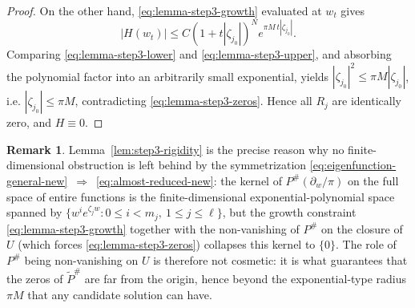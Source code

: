 \documentclass[a4paper,11pt,reqno]{amsart}
\numberwithin{equation}{section}
\theoremstyle{plain} %
\theoremstyle{definition} %
\newtheorem{remark}{Remark}[section]
\theoremstyle{remark}
\begin{document}
\begin{proof}
On the other hand, \eqref{eq:lemma-step3-growth} evaluated at $w_t$ gives
\begin{equation}\label{eq:lemma-step3-upper}
|H(w_t)|
\le
C(1+t|\zeta_{j_0}|)^N e^{\pi M\,t|\zeta_{j_0}|}.
\end{equation}
Comparing \eqref{eq:lemma-step3-lower} and \eqref{eq:lemma-step3-upper},
and absorbing the polynomial factor into an arbitrarily small exponential,
yields \(|\zeta_{j_0}|^2\le\pi M|\zeta_{j_0}|\), i.e.
\(|\zeta_{j_0}|\le\pi M\), contradicting \eqref{eq:lemma-step3-zeros}. Hence
all $R_j$ are identically zero, and \(H\equiv0\).
\end{proof}

\begin{remark}\label{rmk:step3-no-hidden-obstruction}
Lemma~\ref{lem:step3-rigidity} is the precise reason why no
finite-dimensional obstruction is left behind by the symmetrization
\eqref{eq:eigenfunction-general-new}~\(\Rightarrow\)~\eqref{eq:almost-reduced-new}:
the kernel of \(P^\#(\partial_w/\pi)\) on the full space of entire functions
is the finite-dimensional exponential-polynomial space spanned by
\(\{w^ie^{\zeta_jw}:0\le i<m_j,\ 1\le j\le\ell\}\), but the growth
constraint \eqref{eq:lemma-step3-growth} together with the non-vanishing of
\(P^\#\) on the closure of \(U\) (which forces \eqref{eq:lemma-step3-zeros})
collapses this kernel to $\{0\}$. The role of $P^\#$ being non-vanishing on
$U$ is therefore not cosmetic: it is what guarantees that the zeros of
$\widetilde P^\#$ are far from the origin, hence beyond the exponential-type
radius $\pi M$ that any candidate solution can have.
\end{remark}
\end{document}
